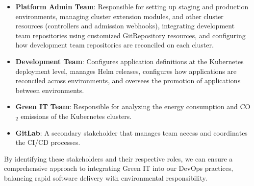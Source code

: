 \begin{itemize}
  \item \textbf{Platform Admin Team}: Responsible for setting up staging and production environments, managing cluster extension modules, and other cluster resources (controllers and admission webhooks), integrating development team repositories using customized GitRepository resources, and configuring how development team repositories are reconciled on each cluster.
  
  \item \textbf{Development Team}: Configures application definitions at the Kubernetes deployment level, manages Helm releases, configures how applications are reconciled across environments, and oversees the promotion of applications between environments.
  
  \item \textbf{Green IT Team}: Responsible for analyzing the energy consumption and CO$_2$ emissions of the Kubernetes clusters. 
  
  \item \textbf{GitLab}: A secondary stakeholder that manages team access and coordinates the CI/CD processes.
\end{itemize}

By identifying these stakeholders and their respective roles, we can ensure a comprehensive approach to integrating Green IT into our DevOps practices, balancing rapid software delivery with environmental responsibility.























